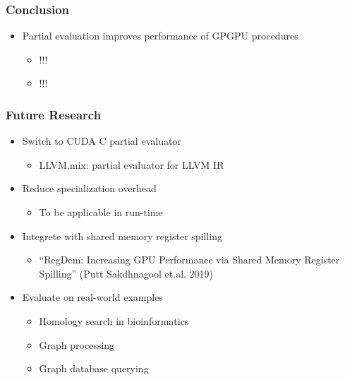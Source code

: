 \documentclass[xcolor=table]{beamer}
\begin{document}
\begin{frame} \frametitle{Conclusion}
  \begin{itemize}
   \item Partial evaluation improves performance of GPGPU procedures
   \begin{itemize}
    \item !!!
    \item !!!
   \end{itemize}
  \end{itemize}
\end{frame}

\begin{frame}[fragile] \frametitle{Future Research}
  \begin{itemize}
    \item Switch to CUDA C partial evaluator
    \begin{itemize}
      \item LLVM.mix: partial evaluator for LLVM IR
    \end{itemize}
    \pause
    \item Reduce specialization overhead
    \begin{itemize}
      \item To be applicable in run-time
    \end{itemize}
    \pause
    \item Integrete with shared memory register spilling
    \begin{itemize}
      \item ``RegDem: Increasing GPU Performance via Shared Memory Register Spilling'' (Putt Sakdhnagool et.al. 2019)
    \end{itemize}
    \pause
    \item Evaluate on real-world examples
    \begin{itemize}
      \item Homology search in bioinformatics
      \item Graph processing
      \item Graph database querying
    \end{itemize}
  \end{itemize}
\end{frame}
\end{document}
